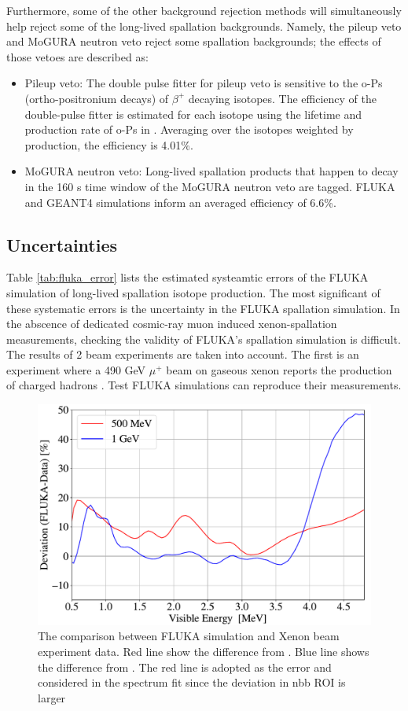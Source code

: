 Furthermore, some of the other background rejection methods will simultaneously help reject some of the long-lived spallation backgrounds. Namely, the pileup veto and MoGURA neutron veto reject some spallation backgrounds; the effects of those vetoes are described as:
\begin{itemize}
	\item Pileup veto:
	The double pulse fitter for pileup veto is sensitive to the o-Ps (ortho-positronium decays) of $\beta^+$ decaying isotopes. The efficiency of the double-pulse fitter is estimated for each isotope using the lifetime and production rate of o-Ps in \cite{positrons_in_kamland}. Averaging over the isotopes weighted by production, the efficiency is 4.01\%.
	\item MoGURA neutron veto:
	Long-lived spallation products that happen to decay in the 160 s time window of the MoGURA neutron veto are tagged. FLUKA and GEANT4 simulations inform an averaged efficiency of 6.6\%.
\end{itemize}

\subsection*{Uncertainties}
Table \ref{tab:fluka_error} lists the estimated systeamtic errors of the FLUKA simulation of long-lived spallation isotope production. The most significant of these systematic errors is the uncertainty in the FLUKA spallation simulation. In the abscence of dedicated cosmic-ray muon induced xenon-spallation measurements, checking the validity of FLUKA's spallation simulation is difficult. The results of 2 beam experiments are taken into account. The first is an experiment where a 490 GeV $\mu^+$ beam on gaseous xenon reports the production of charged hadrons \cite{mubeam_fluka}. Test FLUKA simulations can reproduce their measurements.

\begin{figure}[htb]
	\centering
	\includegraphics[scale=0.35]{distortion.png}
	\caption{The comparison between FLUKA simulation and Xenon beam experiment data. Red line show the diﬀerence from \cite{xenonbeam_500MeV}. Blue line shows the diﬀerence from \cite{xenonbeam_1GeV}. The red line is adopted as the error and considered in the spectrum ﬁt since the deviation in \0nbb ROI is larger}
	\label{fig:distortion}
\end{figure}

